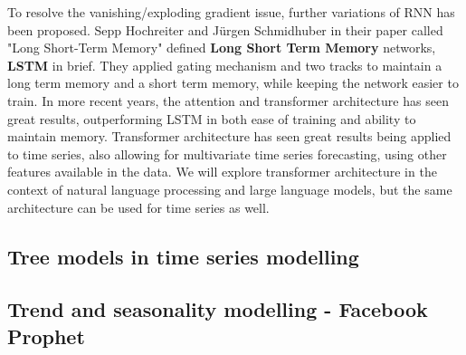 To resolve the vanishing/exploding gradient issue, further variations of RNN has been proposed. Sepp Hochreiter and Jürgen Schmidhuber in their paper called "Long Short-Term Memory" defined \textbf{Long Short Term Memory} networks, \textbf{LSTM} in brief. They applied gating mechanism and two tracks to maintain a long term memory and a short term memory, while keeping the network easier to train. In more recent years, the attention and transformer architecture has seen great results, outperforming LSTM in both ease of training and ability to maintain memory. Transformer architecture has seen great results being applied to time series, also allowing for multivariate time series forecasting, using other features available in the data. We will explore transformer architecture in the context of natural language processing and large language models, but the same architecture can be used for time series as well.

\subsection{Tree models in time series modelling}



\subsection{Trend and seasonality modelling - Facebook Prophet}


